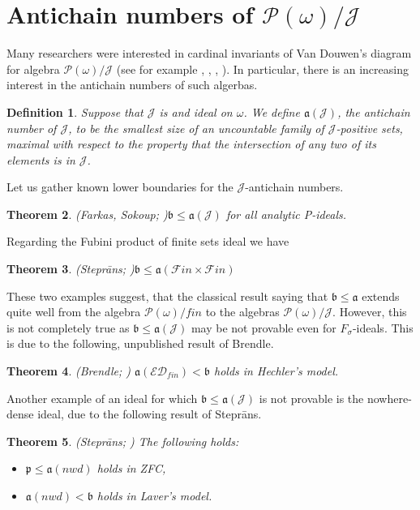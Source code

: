 \documentclass[a4paper]{amsart}
\newtheorem{theorem}{Theorem}[section]
\newtheorem{definition}[theorem]{Definition}
\newcommand{\aaa}{\mathfrak{a}}
\newcommand{\bbb}{\mathfrak{b}}
\newcommand{\ppp}{\mathfrak{p}}
\newcommand{\J}{\mathcal{J}}
\newcommand{\ED}{\mathcal{ED}}
\newcommand{\FF}{\mathcal{F}in\times\mathcal{F}in}
\newcommand{\nwd}{nwd}
\begin{document}
\section{Antichain numbers of $\mathcal{P}(\omega)/\J$}
Many researchers were interested in cardinal invariants of Van Douwen's diagram for algebra $\mathcal{P}(\omega)/ \J$ (see for example \cite{HrusBalcar}, \cite{Stevo}, \cite{FilipowNice}, \cite{BrendleDiego}). In particular, there is an increasing interest in the antichain numbers of such algerbas.
\begin{definition}
    Suppose that $\J$ is and ideal on $\omega$. We define $\aaa(\J)$, the antichain number of $\J$, to be the smallest size of an uncountable family of $\J$-positive sets, maximal with respect to the property that the intersection of any two of its elements is in $\J$.
\end{definition}
Let us gather known lower boundaries for the $\J$-antichain numbers.
\begin{theorem}(Farkas, Sokoup; \cite{FarkSoukup})\label{FarkasSokoup}
    $\bbb\leq\aaa(\J)$ for all analytic P-ideals.
\end{theorem}
Regarding the Fubini product of finite sets ideal we have
\begin{theorem}(Steprāns; \cite{Steprans})\label{BrendleFFantichains}
    $\bbb\leq\aaa(\FF)$
\end{theorem}
These two examples suggest, that the classical result saying that $\bbb\leq\aaa$ extends quite well from the algebra $\mathcal{P}(\omega)/fin$ to the algebras $\mathcal{P}(\omega)/\J$. However, this is not completely true as $\bbb\leq\aaa(\J)$ may be not provable even for $F_{\sigma}$-ideals. This is due to the following, unpublished result of Brendle.
\begin{theorem}(Brendle; \cite{BrendleAntichains})
    $\aaa(\ED_{fin})<\bbb$ holds in Hechler's model.
\end{theorem}
Another example of an ideal for which $\bbb\leq\aaa(\J)$ is not provable is the nowhere-dense ideal, due to the following result of Steprāns.
\begin{theorem}(Steprāns; \cite{Steprans})
    The following holds:
    \begin{itemize}
        \item[--] $\ppp\leq\aaa(\nwd)$ holds in ZFC,
        \item[--] $\aaa(\nwd)<\bbb$ holds in Laver's model.
    \end{itemize}
\end{theorem}
\end{document}

